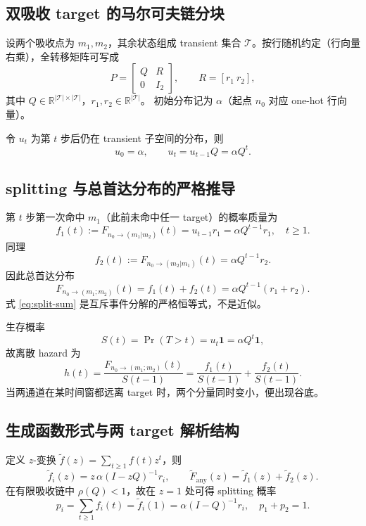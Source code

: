 \documentclass[11pt,fontset=fandol]{ctexart}
\begin{document}
\subsection{双吸收 target 的马尔可夫链分块}
设两个吸收点为 $m_1,m_2$，其余状态组成 transient 集合 $\mathcal T$。按行随机约定（行向量右乘），全转移矩阵可写成
\begin{equation}
P=
\begin{bmatrix}
Q & R\\
0 & I_2
\end{bmatrix},\qquad
R=[r_1\ r_2],
\end{equation}
其中 $Q\in\mathbb R^{|\mathcal T|\times|\mathcal T|}$，$r_1,r_2\in\mathbb R^{|\mathcal T|}$。
初始分布记为 $\alpha$（起点 $n_0$ 对应 one-hot 行向量）。

令 $u_t$ 为第 $t$ 步后仍在 transient 子空间的分布，则
\begin{equation}
u_0=\alpha,\qquad u_t=u_{t-1}Q=\alpha Q^t.
\end{equation}

\subsection{splitting 与总首达分布的严格推导}
第 $t$ 步第一次命中 $m_1$（此前未命中任一 target）的概率质量为
\begin{equation}
f_1(t):=F_{n_0\to(m_1|m_2)}(t)=u_{t-1}r_1=\alpha Q^{t-1}r_1,\quad t\ge1.
\end{equation}
同理
\begin{equation}
f_2(t):=F_{n_0\to(m_2|m_1)}(t)=\alpha Q^{t-1}r_2.
\end{equation}
因此总首达分布
\begin{equation}
F_{n_0\to(m_1;m_2)}(t)=f_1(t)+f_2(t)=\alpha Q^{t-1}(r_1+r_2).
\label{eq:split-sum}
\end{equation}
式 \eqref{eq:split-sum} 是互斥事件分解的严格恒等式，不是近似。

生存概率
\begin{equation}
S(t)=\Pr(T>t)=u_t\mathbf 1=\alpha Q^t\mathbf 1,
\end{equation}
故离散 hazard 为
\begin{equation}
h(t)=\frac{F_{n_0\to(m_1;m_2)}(t)}{S(t-1)}=\frac{f_1(t)}{S(t-1)}+\frac{f_2(t)}{S(t-1)}.
\end{equation}
当两通道在某时间窗都远离 target 时，两个分量同时变小，便出现谷底。

\subsection{生成函数形式与两 target 解析结构}
定义 $z$-变换 $\tilde f(z)=\sum_{t\ge1}f(t)z^t$，则
\begin{equation}
\tilde f_i(z)=z\,\alpha(I-zQ)^{-1}r_i,\qquad
\tilde F_{\mathrm{any}}(z)=\tilde f_1(z)+\tilde f_2(z).
\end{equation}
在有限吸收链中 $\rho(Q)<1$，故在 $z=1$ 处可得 splitting 概率
\begin{equation}
p_i=\sum_{t\ge1}f_i(t)=\tilde f_i(1)=\alpha(I-Q)^{-1}r_i,
\quad p_1+p_2=1.
\end{equation}
\end{document}
